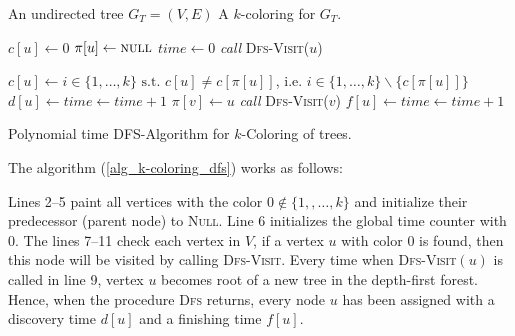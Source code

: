 \documentclass[11pt]{article}
\begin{document}
\begin{algorithm}[H]
\small
\begin{algorithmic}[1]
	\Require An undirected tree $G_{T} = (V,E)$
	\Ensure A $k$-coloring for $G_{T}$.
	\newline

			\State $c[u] \gets 0$ 
			\State $\pi[u] \gets \text{\textsc{null}}$ 
		\EndFor
		\State $time \gets 0$ 
				\State \textit{call} \textsc{Dfs-Visit}($u$)
			\EndIf
		\EndFor
	\EndProcedure
	\newline

		\Statex{}
		\State $c[u] \gets i \in \{1,\ldots,k\} \text{ s.t. } c[u] \neq c[\pi[u]]$, i.e. $i \in \{1,\ldots,k\}\backslash \{c[\pi[u]]\}$
		\State $d[u] \gets time \gets time + 1$ 
		 
				\State $\pi[v] \gets u$
				\State \textit{call} \textsc{Dfs-Visit($v$)}
			\EndIf
		 \EndFor
		 \State $f[u] \gets time \gets time + 1$ 
	\EndProcedure	
\end{algorithmic}
\caption{\small Polynomial time DFS-Algorithm for $k$-Coloring of trees.}
\label{alg_k-coloring_dfs}
\end{algorithm}%

The algorithm (\ref{alg_k-coloring_dfs}) works as follows:

Lines 2--5 paint all vertices with the color $0\notin \{1,,\ldots ,k\}$ and
initialize their predecessor (parent node) to \textsc{Null}. Line 6
initializes the global time counter with $0$. The lines 7--11 check each
vertex in $V$, if a vertex $u$ with color $0$ is found, then this node will
be visited by calling \textsc{Dfs-Visit}. Every time when \textsc{Dfs-Visit}$%
(u)$ is called in line 9, vertex $u$ becomes root of a new tree in the
depth-first forest. Hence, when the procedure \textsc{Dfs} returns, every
node $u$ has been assigned with a discovery time $d[u]$ and a finishing time 
$f[u]$.
\end{document}
